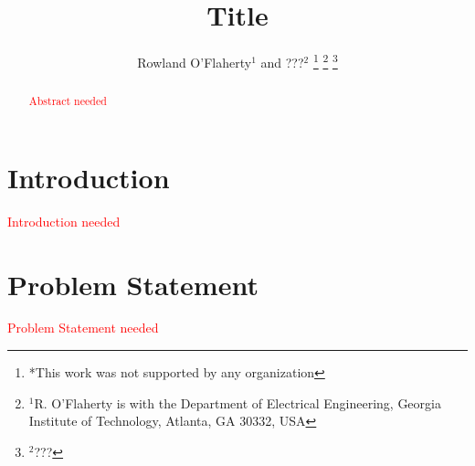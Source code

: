 \documentclass[letterpaper, 10 pt, conference]{ieeeconf}
\providecommand{\note}{\textcolor{red}} %
\begin{document}


\pagestyle{plain}

\title{\LARGE \bf
	Title
}

\author{Rowland O'Flaherty$^{1}$ and ???$^{2}$%
\thanks{*This work was not supported by any organization}%
\thanks{$^{1}$R. O'Flaherty is with the Department of Electrical Engineering, Georgia Institute of Technology, Atlanta, GA 30332, USA}%
\thanks{$^{2}$???}%
}

\maketitle
\thispagestyle{empty}
\pagestyle{empty}

\begin{abstract}
\note{Abstract needed}
\end{abstract}

\section{Introduction} \label{sec:introduction}
\note{Introduction needed}

\section{Problem Statement} \label{sec:problemStatement}
\note{Problem Statement needed}
\end{document}
